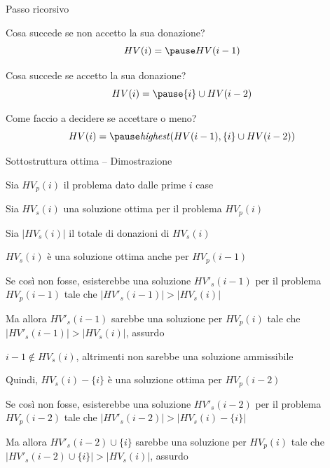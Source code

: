 \begin{frame}{Passo ricorsivo}

\BI
\item Cosa succede se non accetto la sua donazione?
\EI
\[
HV(i) = \pause HV(i-1)
\]

\BI
\item Cosa succede se accetto la sua donazione?
\EI
\[
HV(i) = \pause \{ i \} \cup HV(i-2)  
\]

\BI
\item Come faccio a decidere se accettare o meno?
\EI
\[
HV(i) = \pause \mathit{highest}(HV(i-1), \{ i \} \cup HV(i-2)  )
\]

\end{frame}

\begin{frame}{Sottostruttura ottima -- Dimostrazione}

\BI
\item Sia $HV_p(i)$ il problema dato dalle prime $i$ case
\item Sia $HV_s(i)$ una soluzione ottima per il problema $HV_p(i)$
\item Sia $|HV_s(i)|$ il totale di donazioni di $HV_s(i)$
\EI

\bigskip
\begin{overprint}
\BIL
\item $HV_s(i)$ è una soluzione ottima anche per $HV_p(i-1)$
\item Se così non fosse, esisterebbe una soluzione $HV'_s(i-1)$ per il
problema $HV_p(i-1)$ tale che $|HV'_s(i-1)|>|HV_s(i)|$
\item Ma allora $HV'_s(i-1)$ sarebbe una soluzione per $HV_p(i)$ tale
che $|HV'_s(i-1)|>|HV_s(i)|$, assurdo
\EIL
{}
\BIL
\item $i-1 \not\in HV_s(i)$, altrimenti non sarebbe una soluzione ammissibile
\item Quindi, $HV_s(i)-\{i\}$ è una soluzione ottima per $HV_p(i-2)$
\item Se così non fosse, esisterebbe una soluzione $HV'_s(i-2)$ per il
problema $HV_p(i-2)$ tale che $|HV'_s(i-2)|>|HV_s(i)-\{i\}|$
\item Ma allora $HV'_s(i-2) \cup \{i \}$ sarebbe una soluzione per $HV_p(i)$
tale che $|HV'_s(i-2) \cup \{i\}|>|HV_s(i)|$, assurdo
\EIL
\end{overprint}


\end{frame}



